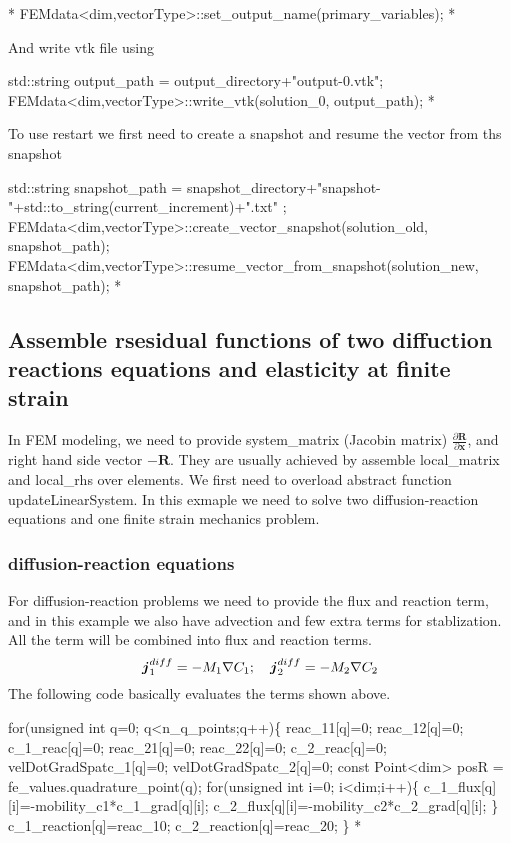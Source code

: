 \begin{DoxyCode}
 *  FEMdata<dim,vectorType>::set_output_name(primary\_variables);
* 
\end{DoxyCode}
 And write vtk file using 
\begin{DoxyCode}
  std::string output\_path = output\_directory+\textcolor{stringliteral}{"output-0.vtk"};
  FEMdata<dim,vectorType>::write_vtk(solution\_0, output\_path);
* 
\end{DoxyCode}
 To use restart we first need to create a snapshot and resume the vector from ths snapshot 
\begin{DoxyCode}
        std::string snapshot\_path = snapshot\_directory+\textcolor{stringliteral}{"snapshot-"}+std::to\_string(current\_increment)+\textcolor{stringliteral}{".txt"}
      ;
        FEMdata<dim,vectorType>::create_vector_snapshot(solution\_old, snapshot\_path);
        FEMdata<dim,vectorType>::resume_vector_from_snapshot(solution\_new, snapshot\_path);
* 
\end{DoxyCode}
 \hypertarget{brain_morph_assemble}{}\subsection{Assemble rsesidual functions of two diffuction reactions equations and elasticity at finite strain}\label{brain_morph_assemble}
In F\-E\-M modeling, we need to provide system\-\_\-matrix (Jacobin matrix) $\frac{\partial \boldsymbol{R}}{\partial \boldsymbol{x}} $, and right hand side vector $-\boldsymbol{R}$. They are usually achieved by assemble {\ttfamily local\-\_\-matrix} and {\ttfamily local\-\_\-rhs} over elements. We first need to overload abstract function {\ttfamily update\-Linear\-System}. In this exmaple we need to solve two diffusion-\/reaction equations and one finite strain mechanics problem. \hypertarget{brain_morph_DRq}{}\subsubsection{diffusion-\/reaction equations}\label{brain_morph_DRq}
For diffusion-\/reaction problems we need to provide the flux and reaction term, and in this example we also have advection and few extra terms for stablization. All the term will be combined into {\ttfamily flux} and {\ttfamily reaction} terms. \[ \boldsymbol{j}_1^{diff}=-M_1\nabla C_\text{1}; \quad \boldsymbol{j}_2^{diff}=-M_2\nabla C_\text{2}\\ \] The following code basically evaluates the terms shown above. 
\begin{DoxyCode}
\textcolor{keywordflow}{for}(\textcolor{keywordtype}{unsigned} \textcolor{keywordtype}{int} q=0; q<n\_q\_points;q++)\{
    reac\_11[q]=0; reac\_12[q]=0; c\_1\_reac[q]=0; 
    reac\_21[q]=0; reac\_22[q]=0; c\_2\_reac[q]=0; 
    velDotGradSpatc\_1[q]=0;
    velDotGradSpatc\_2[q]=0;
    \textcolor{keyword}{const} Point<dim> posR = fe\_values.quadrature\_point(q);
    \textcolor{keywordflow}{for}(\textcolor{keywordtype}{unsigned} \textcolor{keywordtype}{int} i=0; i<dim;i++)\{
        c\_1\_flux[q][i]=-mobility\_c1*c\_1\_grad[q][i];
        c\_2\_flux[q][i]=-mobility\_c2*c\_2\_grad[q][i];
    \}       
    c\_1\_reaction[q]=reac\_10;
    c\_2\_reaction[q]=reac\_20;
\}
*
\end{DoxyCode}
